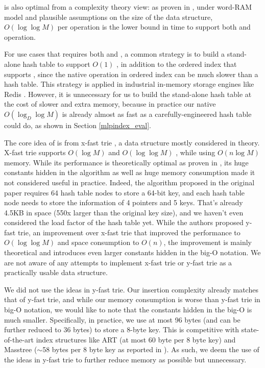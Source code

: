 \documentclass[11pt, usletter]{article}
\begin{document}
\MlpIndex is also optimal from a complexity theory view: as proven in \cite{ajtai88comb-lowerbound}, 
under word-RAM model and plausible assumptions on the size of the data structure, 
$O(\log \log M)$ per operation is the lower bound in time to support both \insertion and \lowerbound operation. 

For use cases that requires both \lookup and \lowerbound, 
a common strategy is to build a stand-alone hash table to support $O(1)$ \lookup, 
in addition to the ordered index that supports \lowerbound, 
since the native \lookup operation in ordered index can be much slower than a hash table.
This strategy is applied in industrial in-memory storage engines like Redis \cite{redis}.
However, it is unnecessary for us to build the stand-alone hash table at the cost of slower \insertion and extra memory, 
because in practice our native $O(\log_D\log M)$ \lookup is already almost as fast as a carefully-engineered hash table could do, 
as shown in Section \ref{mlpindex_eval}.

The core idea of \MlpIndex is from x-fast trie \cite{xfast}, a data structure mostly considered in theory.
X-fast trie supports $O(\log M)$ \insertion and $O(\log\log M)$ \lowerbound, while using $O(n\log M)$ memory.
While its \lowerbound performance is theoretically optimal as proven in \cite{ajtai88comb-lowerbound},
its huge constants hidden in the algorithm as well as huge memory consumption made it not considered useful in practice. 
Indeed, the algorithm proposed in the original paper requires 64 hash table nodes to store a 64-bit key, 
and each hash table node needs to store the information of 4 pointers and 5 keys. 
That's already 4.5KB in space (550x larger than the original key size), 
and we haven't even considered the load factor of the hash table yet. 
While the authors proposed y-fast trie, 
an improvement over x-fast trie that improved the \insertion performance to $O(\log\log M)$ and space consumption to $O(n)$, 
the improvement is mainly theoretical and introduces even larger constants hidden in the big-O notation. 
We are not aware of any attempts to implement x-fast trie or y-fast trie as a practically usable data structure. 

We did not use the ideas in y-fast trie. Our insertion complexity already matches that of y-fast trie, 
and while our memory consumption is worse than y-fast trie in big-O notation, 
we would like to note that the constants hidden in the big-O is much smaller.
Specifically, in practice, we use at most 96 bytes (and can be further reduced to 36 bytes) to store a 8-byte key. 
This is competitive with state-of-the-art index structures like ART \cite{arttrie_icde13} (at most 60 byte per 8 byte key) 
and Masstree \cite{masstree} ($\sim$58 bytes per 8 byte key as reported in \cite{hot_sigmod18}).
As such, we deem the use of the ideas in y-fast trie to further reduce memory as possible but unnecessary.
\end{document}

